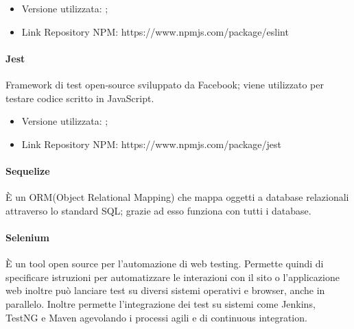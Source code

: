 \documentclass[../manuale_sviluppatore.tex]{subfiles}
\begin{document}
\begin{itemize}
    \item Versione utilizzata: ;
    \item Link Repository NPM: https://www.npmjs.com/package/eslint 
\end{itemize}

\paragraph{Jest}
Framework di test open-source sviluppato da Facebook; viene utilizzato per testare codice scritto in JavaScript. 
\begin{itemize}
    \item Versione utilizzata: ;
    \item Link Repository NPM: https://www.npmjs.com/package/jest 
\end{itemize}

\paragraph{Sequelize}
È un ORM(Object Relational Mapping) che mappa oggetti a database relazionali attraverso lo standard SQL; grazie ad esso funziona con tutti i database.

\paragraph{Selenium}
È un tool open source per l'automazione di web testing. Permette quindi di specificare istruzioni per automatizzare le interazioni con il sito o l’applicazione web inoltre può lanciare test su diversi sistemi operativi e browser, anche in parallelo. 
Inoltre permette l’integrazione dei test su sistemi come Jenkins, TestNG e Maven agevolando i processi agili e di continuous integration.
\end{document}
